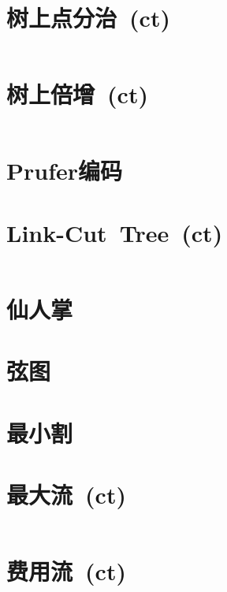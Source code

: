 \section{树上点分治\ \small(ct)}
	\inputminted{cpp}{GraphTheory/divide_conquer_on_tree.cpp}
\section{树上倍增\ \small(ct)}
	\inputminted{cpp}{GraphTheory/multiplier_on_tree.cpp}
\section{Prufer编码}
\section{Link-Cut\ Tree\ \small(ct)}
	\inputminted{cpp}{GraphTheory/link_cut_tree.cpp}
\section{仙人掌}
\section{弦图}
\section{最小割}
\section{最大流\ \small(ct)}
	\inputminted{cpp}{GraphTheory/dinic.cpp}
\section{费用流\ \small(ct)}
	\inputminted{cpp}{GraphTheory/min_cost_max_flow.cpp}
